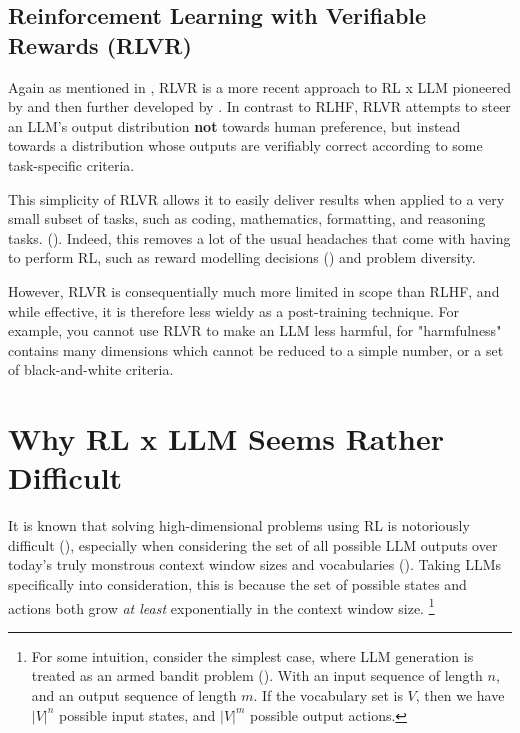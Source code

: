 \documentclass{article} %
\theoremstyle{definition}
\begin{document}
\subsection{Reinforcement Learning with Verifiable Rewards (RLVR)}
Again as mentioned in \cite{beh-2025-b}, RLVR is a more recent approach to RL x LLM
pioneered by \cite{Lambert-et-al-2024} and then further developed by \cite{DeepSeek-2025}.
In contrast to RLHF, RLVR attempts to steer an LLM's output distribution \textbf{not} 
towards human preference, but instead towards a distribution whose outputs
are verifiably correct according to some task-specific criteria.

This simplicity of RLVR allows it to easily deliver results when applied to 
a very small subset of tasks, such as coding, mathematics, formatting, and reasoning tasks.
(\cite{Lambert-et-al-2024, DeepSeek-2025}). Indeed, this removes a lot of the 
usual headaches that come with having to perform RL, such as reward modelling 
decisions (\cite{openai-rew-hacking}) and problem diversity.

However, RLVR is consequentially much more limited in scope than RLHF,
and while effective, it is therefore less wieldy as a post-training technique.
For example, you cannot use RLVR to make an LLM less harmful, for "harmfulness"
contains many dimensions which cannot be reduced to a simple number,
or a set of black-and-white criteria.

\section{Why RL x LLM Seems Rather Difficult}

It is known that solving high-dimensional problems using RL is notoriously difficult 
(\cite{Sutton-and-Barto-1998, Jones-2021}),
especially when considering the set of all possible LLM outputs over today's
truly monstrous context window sizes and vocabularies (\cite{Anthropic-2025, DeepSeek-2025, Google-2025}).
Taking LLMs specifically into consideration,
this is because the set of possible states and actions both grow \textit{at least} exponentially
in the context window size. \footnote{
    For some intuition, consider the simplest case, where
    LLM generation is treated as an armed bandit problem (\cite{Sutton-and-Barto-1998}).
    With an input sequence of length $n$,
    and an output sequence of length $m$.
    If the vocabulary set is $V$,
    then we have $|V|^n$ possible input states,
    and $|V|^m$ possible output actions.
}
\end{document}
